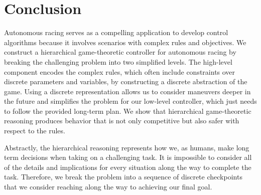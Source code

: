 \chapter{Conclusion} \label{chapter:conclusion}
Autonomous racing serves as a compelling application to develop control algorithms because it involves scenarios with complex rules and objectives. We construct a hierarchical game-theoretic controller for autonomous racing by breaking the challenging problem into two simplified levels. The high-level component encodes the complex rules, which often include constraints over discrete parameters and variables, by constructing a discrete abstraction of the game. Using a discrete representation allows us to consider maneuvers deeper in the future and simplifies the problem for our low-level controller, which just needs to follow the provided long-term plan. We show that hierarchical game-theoretic reasoning produces behavior that is not only competitive but also safer with respect to the rules. 

Abstractly, the hierarchical reasoning represents how we, as humans, make long term decisions when taking on a challenging task. It is impossible to consider all of the details and implications for every situation along the way to complete the task. Therefore, we break the problem into a sequence of discrete checkpoints that we consider reaching along the way to achieving our final goal. 

